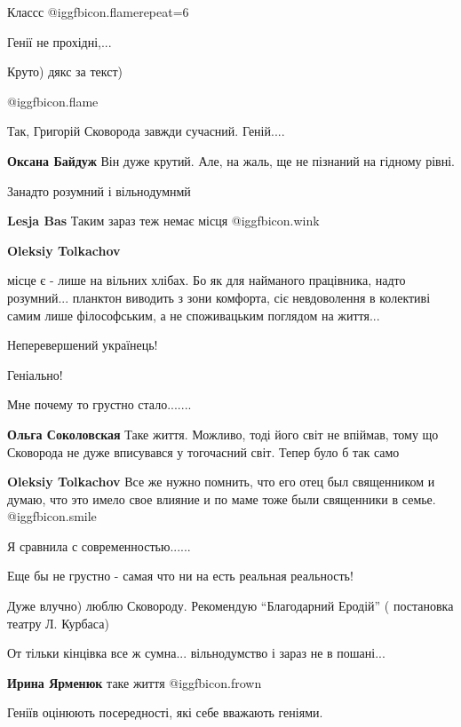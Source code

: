  
 
 
 
 
\zzSecCmt

\begin{itemize} %
Классс @igg{fbicon.flame}{repeat=6} 

Генії не прохідні,...

Круто) дякс за текст)

 @igg{fbicon.flame} 

Так, Григорій Сковорода завжди сучасний. Геній....

\textbf{Оксана Байдуж} Він дуже крутий. Але, на жаль, ще не пізнаний на гідному рівні.

Занадто розумний і вільнодумнмй

\textbf{Lesja Bas} Таким зараз теж немає місця  @igg{fbicon.wink} 

\textbf{Oleksiy Tolkachov} 

місце є - лише на вільних хлібах. Бо як для найманого працівника, надто
розумний... планктон виводить з зони комфорта, сіє невдоволення в колективі
самим лише філософським, а не споживацьким поглядом на життя...

Неперевершений українець!

Геніально!

Мне почему то грустно стало.......

\textbf{Ольга Соколовская} Таке життя. Можливо, тоді його світ не впіймав, тому що Сковорода не дуже вписувався у тогочасний світ. Тепер було б так само

\textbf{Oleksiy Tolkachov} Все же нужно помнить, что его отец был священником и думаю, что это имело свое влияние и по маме тоже были священники в семье.  @igg{fbicon.smile} 

Я сравнила с современностью......

Еще бы не грустно - самая что ни на есть реальная реальность!

Дуже влучно) люблю Сковороду. Рекомендую \enquote{Благодарний Еродій} ( постановка театру Л. Курбаса)

От тільки кінцівка все ж сумна... вільнодумство і зараз не в пошані...

\textbf{Ирина Ярменюк} таке життя  @igg{fbicon.frown} 

Геніїв оцінюють посередності, які себе вважають геніями.

\end{itemize} %
